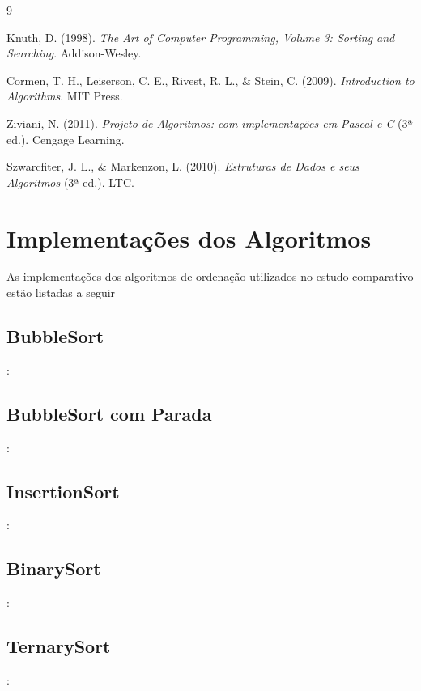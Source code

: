 \documentclass[a4paper, 12pt]{article} %
\begin{document}
\begin{thebibliography}{9}

Knuth, D. (1998). \textit{The Art of Computer Programming, Volume 3: Sorting and Searching}. Addison-Wesley.

Cormen, T. H., Leiserson, C. E., Rivest, R. L., & Stein, C. (2009). \textit{Introduction to Algorithms}. MIT Press.

Ziviani, N. (2011). \textit{Projeto de Algoritmos: com implementações em Pascal e C} (3ª ed.). Cengage Learning.

Szwarcfiter, J. L., & Markenzon, L. (2010). \textit{Estruturas de Dados e seus Algoritmos} (3ª ed.). LTC.

\end{thebibliography}

\section{Implementações dos Algoritmos}
As implementações dos algoritmos de ordenação utilizados no estudo comparativo estão listadas a seguir

\subsection{BubbleSort}:


\subsection{BubbleSort com Parada}:


\subsection{InsertionSort}:


\subsection{BinarySort}:


\subsection{TernarySort}:

\end{document}
